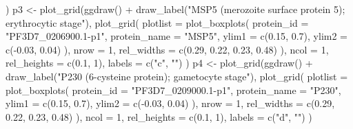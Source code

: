 \documentclass[
  11pt,
  oneside]{book}
\newenvironment{Shaded}{\begin{snugshade}}{\end{snugshade}}
\newcommand{\AttributeTok}[1]{\textcolor[rgb]{0.77,0.63,0.00}{#1}}
\newcommand{\DecValTok}[1]{\textcolor[rgb]{0.00,0.00,0.81}{#1}}
\newcommand{\FloatTok}[1]{\textcolor[rgb]{0.00,0.00,0.81}{#1}}
\newcommand{\FunctionTok}[1]{\textcolor[rgb]{0.00,0.00,0.00}{#1}}
\newcommand{\NormalTok}[1]{#1}
\newcommand{\OtherTok}[1]{\textcolor[rgb]{0.56,0.35,0.01}{#1}}
\newcommand{\SpecialCharTok}[1]{\textcolor[rgb]{0.00,0.00,0.00}{#1}}
\newcommand{\StringTok}[1]{\textcolor[rgb]{0.31,0.60,0.02}{#1}}
\begin{document}
\begin{Shaded}
\begin{Highlighting}[]
\NormalTok{)}
\NormalTok{p3 }\OtherTok{\textless{}{-}} \FunctionTok{plot\_grid}\NormalTok{(}\FunctionTok{ggdraw}\NormalTok{() }\SpecialCharTok{+} \FunctionTok{draw\_label}\NormalTok{(}\StringTok{"MSP5 (merozoite surface protein 5); erythrocytic stage"}\NormalTok{),}
  \FunctionTok{plot\_grid}\NormalTok{(}
    \AttributeTok{plotlist =} \FunctionTok{plot\_boxplots}\NormalTok{(}
      \AttributeTok{protein\_id =} \StringTok{"PF3D7\_0206900.1{-}p1"}\NormalTok{, }\AttributeTok{protein\_name =} \StringTok{"MSP5"}\NormalTok{,}
      \AttributeTok{ylim1 =} \FunctionTok{c}\NormalTok{(}\FloatTok{0.15}\NormalTok{, }\FloatTok{0.7}\NormalTok{), }\AttributeTok{ylim2 =} \FunctionTok{c}\NormalTok{(}\SpecialCharTok{{-}}\FloatTok{0.03}\NormalTok{, }\FloatTok{0.04}\NormalTok{)}
\NormalTok{    ),}
    \AttributeTok{nrow =} \DecValTok{1}\NormalTok{, }\AttributeTok{rel\_widths =} \FunctionTok{c}\NormalTok{(}\FloatTok{0.29}\NormalTok{, }\FloatTok{0.22}\NormalTok{, }\FloatTok{0.23}\NormalTok{, }\FloatTok{0.48}\NormalTok{)}
\NormalTok{  ),}
  \AttributeTok{ncol =} \DecValTok{1}\NormalTok{, }\AttributeTok{rel\_heights =} \FunctionTok{c}\NormalTok{(}\FloatTok{0.1}\NormalTok{, }\DecValTok{1}\NormalTok{), }\AttributeTok{labels =} \FunctionTok{c}\NormalTok{(}\StringTok{"c"}\NormalTok{, }\StringTok{""}\NormalTok{)}
\NormalTok{)}
\NormalTok{p4 }\OtherTok{\textless{}{-}} \FunctionTok{plot\_grid}\NormalTok{(}\FunctionTok{ggdraw}\NormalTok{() }\SpecialCharTok{+} \FunctionTok{draw\_label}\NormalTok{(}\StringTok{"P230 (6{-}cysteine protein); gametocyte stage"}\NormalTok{),}
  \FunctionTok{plot\_grid}\NormalTok{(}
    \AttributeTok{plotlist =} \FunctionTok{plot\_boxplots}\NormalTok{(}
      \AttributeTok{protein\_id =} \StringTok{"PF3D7\_0209000.1{-}p1"}\NormalTok{, }\AttributeTok{protein\_name =} \StringTok{"P230"}\NormalTok{,}
      \AttributeTok{ylim1 =} \FunctionTok{c}\NormalTok{(}\FloatTok{0.15}\NormalTok{, }\FloatTok{0.7}\NormalTok{), }\AttributeTok{ylim2 =} \FunctionTok{c}\NormalTok{(}\SpecialCharTok{{-}}\FloatTok{0.03}\NormalTok{, }\FloatTok{0.04}\NormalTok{)}
\NormalTok{    ),}
    \AttributeTok{nrow =} \DecValTok{1}\NormalTok{, }\AttributeTok{rel\_widths =} \FunctionTok{c}\NormalTok{(}\FloatTok{0.29}\NormalTok{, }\FloatTok{0.22}\NormalTok{, }\FloatTok{0.23}\NormalTok{, }\FloatTok{0.48}\NormalTok{)}
\NormalTok{  ),}
  \AttributeTok{ncol =} \DecValTok{1}\NormalTok{, }\AttributeTok{rel\_heights =} \FunctionTok{c}\NormalTok{(}\FloatTok{0.1}\NormalTok{, }\DecValTok{1}\NormalTok{), }\AttributeTok{labels =} \FunctionTok{c}\NormalTok{(}\StringTok{"d"}\NormalTok{, }\StringTok{""}\NormalTok{)}
\NormalTok{)}
\end{Highlighting}
\end{Shaded}
\end{document}
